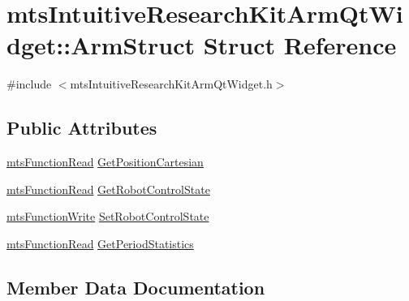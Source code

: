\hypertarget{structmts_intuitive_research_kit_arm_qt_widget_1_1_arm_struct}{}\section{mts\+Intuitive\+Research\+Kit\+Arm\+Qt\+Widget\+:\+:Arm\+Struct Struct Reference}
\label{structmts_intuitive_research_kit_arm_qt_widget_1_1_arm_struct}


{\ttfamily \#include $<$mts\+Intuitive\+Research\+Kit\+Arm\+Qt\+Widget.\+h$>$}

\subsection*{Public Attributes}
\begin{DoxyCompactItemize}
\item 
\hyperlink{classmts_function_read}{mts\+Function\+Read} \hyperlink{structmts_intuitive_research_kit_arm_qt_widget_1_1_arm_struct_a782dd4ed23181a9d1d3759ea340e2682}{Get\+Position\+Cartesian}
\item 
\hyperlink{classmts_function_read}{mts\+Function\+Read} \hyperlink{structmts_intuitive_research_kit_arm_qt_widget_1_1_arm_struct_a486a46581e79c411c4bfbe7e1b210314}{Get\+Robot\+Control\+State}
\item 
\hyperlink{classmts_function_write}{mts\+Function\+Write} \hyperlink{structmts_intuitive_research_kit_arm_qt_widget_1_1_arm_struct_a91a2147d07e6b4e2c578bac2a0250696}{Set\+Robot\+Control\+State}
\item 
\hyperlink{classmts_function_read}{mts\+Function\+Read} \hyperlink{structmts_intuitive_research_kit_arm_qt_widget_1_1_arm_struct_a75d48455f6739838ddfe1ea9c1c07ccc}{Get\+Period\+Statistics}
\end{DoxyCompactItemize}


\subsection{Member Data Documentation}
\hypertarget{structmts_intuitive_research_kit_arm_qt_widget_1_1_arm_struct_a75d48455f6739838ddfe1ea9c1c07ccc}{}

